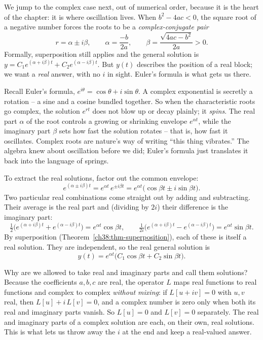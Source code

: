 We jump to the complex case next, out of numerical order, because it is the heart
of the chapter: it is where oscillation lives. When $b^2 - 4ac < 0$, the square
root of a negative number forces the roots to be a \emph{complex-conjugate pair}
\[
  r = \alpha \pm i\beta,
  \qquad
  \alpha = \frac{-b}{2a}, \qquad
  \beta = \frac{\sqrt{4ac - b^2}}{2a} > 0.
\]
Formally, superposition still applies and the general solution is
$y = C_1 e^{(\alpha + i\beta)t} + C_2 e^{(\alpha - i\beta)t}$. But $y(t)$
describes the position of a real block; we want a \emph{real} answer, with no $i$
in sight. Euler's formula is what gets us there.

\begin{happeningbox}
Recall Euler's formula, $e^{i\theta} = \cos\theta + i\sin\theta$. A complex
exponential is secretly a rotation -- a sine and a cosine bundled together. So
when the characteristic roots go complex, the solution $e^{rt}$ does not blow up
or decay plainly; it \emph{spins}. The real part $\alpha$ of the root controls a
growing or shrinking envelope $e^{\alpha t}$, while the imaginary part $\beta$
sets how fast the solution rotates -- that is, how fast it oscillates. Complex
roots are nature's way of writing ``this thing vibrates.'' The algebra knew about
oscillation before we did; Euler's formula just translates it back into the
language of springs.
\end{happeningbox}

To extract the real solutions, factor out the common envelope:
\[
  e^{(\alpha \pm i\beta)t} = e^{\alpha t}\, e^{\pm i\beta t}
  = e^{\alpha t}\big(\cos\beta t \pm i \sin\beta t\big).
\]
Two particular real combinations come straight out by adding and subtracting.
Their average is the real part and (dividing by $2i$) their difference is the
imaginary part:
\[
  \tfrac12\big(e^{(\alpha+i\beta)t} + e^{(\alpha-i\beta)t}\big)
  = e^{\alpha t}\cos\beta t,
  \qquad
  \tfrac{1}{2i}\big(e^{(\alpha+i\beta)t} - e^{(\alpha-i\beta)t}\big)
  = e^{\alpha t}\sin\beta t.
\]
By superposition (Theorem~\ref{ch38:thm-superposition}), each of these is itself
a real solution. They are independent, so the real general solution is
\begin{equation}
  \boxed{\,y(t) = e^{\alpha t}\big(C_1 \cos\beta t + C_2 \sin\beta t\big).\,}
  \label{ch38:complex-general}
\end{equation}

\begin{whybox}
Why are we allowed to take real and imaginary parts and call them solutions?
Because the coefficients $a, b, c$ are real, the operator $L$ maps real functions
to real functions and complex to complex \emph{without mixing}: if $L[u + iv] = 0$
with $u, v$ real, then $L[u] + i\,L[v] = 0$, and a complex number is zero only
when both its real and imaginary parts vanish. So $L[u] = 0$ and $L[v] = 0$
separately. The real and imaginary parts of a complex solution are each, on their
own, real solutions. This is what lets us throw away the $i$ at the
end and keep a real-valued answer.
\end{whybox}

